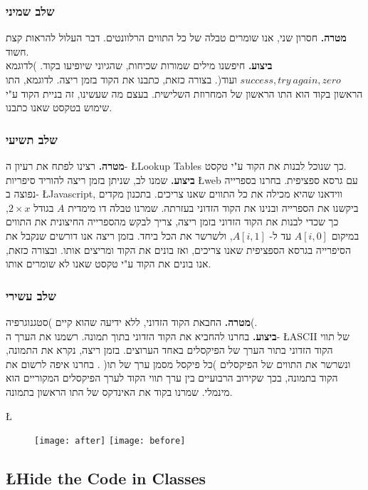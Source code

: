 \documentclass{article}
\newcommand{\goal}{\textbf{מטרה. }}
\newcommand{\action}{\textbf{ביצוע. }}
\begin{document}
			\subsubsection{שלב שמיני}
			\goal
			חסרון שני, אנו שומרים טבלה של כל התווים הרלוונטים. 
			דבר העלול להראות קצת חשוד. \\
			\action 
			חיפשנו מילים שמורות שכיחות, שהגיוני שיופיעו בקוד. )לדוגמא 
			$success, try\ again, zero$ 
			ועוד(. 
			בצורה כזאת, כתבנו את הקוד בזמן ריצה. 
			לדוגמא, התו הראשון בקוד הוא התו הראשון של המחרוזת השלישית. 
			בעצם מה שעשינו, זה בניית הקוד ע"י שימוש בטקסט שאנו כתבנו. 
			\subsubsection{שלב תשיעי}
			\goal 
			רצינו לפתח את רעיון ה- 
			\L{Lookup Tables} 
			כך שנוכל לבנות את הקוד ע"י טקסט. \\
			\action
			שמנו לב, שניתן בזמן ריצה להוריד סיפריות 
			\L{web} 
			עם גרסא ספציפית. בחרנו בספרייה נפוצה ב- 
			\L{Javascript}, 
			ווידאנו שהיא מכילה את כל התווים שאנו צריכים. 
			בתכנון מקדים ביקשנו את הספרייה ובנינו את הקוד הזדוני בעזרתה. 
			שמרנו טבלה דו מימדית $A$ בגודל $2 \times x$, כך שכדי לבנות את 
			הקוד הזדוני בזמן ריצה, צריך לבקש מהספרייה החיצונית את התווים  
			במיקום 
			$A[i, 0]$ 
			עד ל- 
			$A[i, 1]$, 
			ולשרשר את הכל ביחד. 
			בזמן ריצה אנו דורשים שנקבל את הסיפרייה בגרסא הספציפית שאנו צריכים, ואז בונים את הקוד ומריצים אותו. 
			ובצורה כזאת, אנו בונים את הקוד ע"י טקסט שאנו לא שומרים אותו. 
			\subsubsection{שלב עשירי} 
			\goal 
			החבאת הקוד הזדוני, ללא ידיעה שהוא קיים )סטגנוגרפיה(. \\
			\action 
			בחרנו להחביא את הקוד הזדוני בתוך תמונה. 
			רשמנו את הערך ה- 
			\L{ASCII} 
			של תווי הקוד הזדוני בתור הערך של הפיקסלים באחד הערוצים. 
			בזמן ריצה, נקרא את התמונה, ונשרשר את התווים של הפיקסלים )כל פיקסל מסמן ערך של תו( . 
			בחרנו איפה לרשום את הקוד בתמונה, בכך שקירוב הרבועיים בין ערך תווי הקוד לערך הפיקסלים המקוריים הוא מינמלי. 
			שמרנו בקוד את האינדקס של התו הראשון בתמונה. 

			\L{\begin{figure}[h]
					\centering
					\texttt{[image: after]}
					\texttt{[image: before]}
			\end{figure}} 
			\subsection*{\L{Hide the Code in Classes}}
\end{document}
